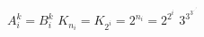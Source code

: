 $A_i^k = B^k_i$ \qquad
$K_{n_i} = K_{2^i} = 2^{n_i}
         = 2^{2^i}$ \qquad
$3^{3^{3^{\cdot^{\cdot^{\cdot^3}}}}}$
